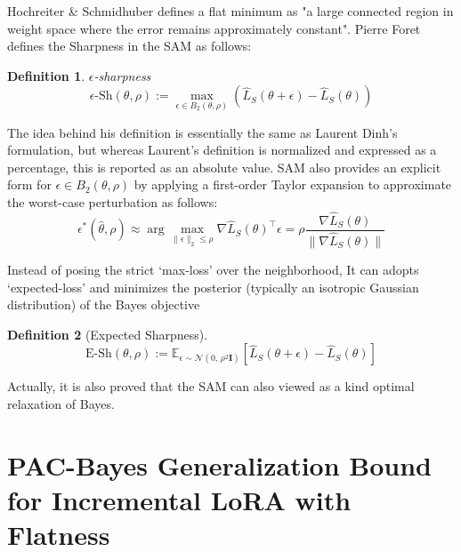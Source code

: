 \documentclass[letterpaper]{article} %
\newtheorem{definition}{Definition}
\begin{document}
Hochreiter \& Schmidhuber\citep{FlatMinima1997} defines a flat minimum as "a large connected region in weight space where the error remains approximately constant". Pierre Foret defines the Sharpness in the SAM as follows: 

\begin{definition} $\epsilon$-sharpness \label{SAM sharpness}
\begin{equation} 
   \epsilon\text{-Sh}(\theta,\rho):= \max _{\epsilon \in B_2(\theta, \rho)}\left(\widehat{L}_S\left(\theta+\epsilon\right)-\widehat{L}_S(\theta)\right)
\end{equation}
\end{definition}
The idea behind his definition is essentially the same as Laurent Dinh’s formulation, but whereas Laurent’s definition is normalized and expressed as a percentage, this is reported as an absolute value. SAM also provides an explicit form for $\epsilon \in B_2(\theta, \rho)$ by applying a first-order Taylor expansion to approximate the worst-case perturbation as follows:
\begin{equation}
    \epsilon^*(\hat{\theta},\rho) 
    \approx  \arg\max_{\|\epsilon\|_2 \leq \rho}\nabla \hat{L}_S(\theta)^\top \epsilon = \rho \frac{\nabla \hat{L}_S(\theta)}{\|\nabla \widehat{L}_S(\theta)\|}
\end{equation}

Instead of posing the strict ‘max-loss’ over the neighborhood, It can adopts ‘expected-loss’ and minimizes the posterior (typically an isotropic Gaussian distribution) of the  Bayes objective \cite{bislaLowPassFilteringSGD2022,liRevisitingRandomWeight2024}
 \begin{definition}[Expected Sharpness]\label{def: Task-Aware Expected Sharpness}
 \begin{equation}
 \text{E-Sh}(\theta,\rho) := \mathbb{E}_{\epsilon \sim \mathcal{N}(0,\, \rho^2 \mathbf{I})}  \left[ \hat{L}_{S}(\theta + \epsilon) - \hat{L}_{S}(\theta) \right] 
 \end{equation}
 \end{definition}
 Actually, it is also proved that the SAM can also viewed as a kind optimal relaxation of Bayes\cite{mollenhoffSAMOptimalRelaxation2022}.


\section{PAC-Bayes Generalization Bound for Incremental LoRA with Flatness}
\end{document}
